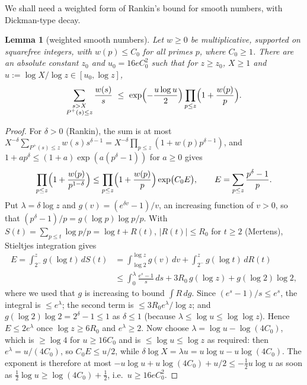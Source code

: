 \documentclass[11pt,a4paper]{article}
\newtheorem{lemma}[theorem]{Lemma}
\theoremstyle{remark}\newtheorem{remark}[theorem]{Remark}
\begin{document}
We shall need a weighted form of Rankin's bound for smooth numbers, with Dickman-type decay.

\begin{lemma}[weighted smooth numbers]\label{lem:rankin}
Let $w\ge0$ be multiplicative, supported on squarefree integers, with $w(p)\le C_0$ for all primes $p$, where
$C_0\ge1$. There are an absolute constant $z_0$ and $u_0=16eC_0^2$ such that for $z\ge z_0$, $X\ge1$ and
$u:=\log X/\log z\in[u_0,\log z]$,
\[
\sum_{\substack{s>X\\ P^+(s)\le z}}\frac{w(s)}{s}\ \le\ \exp\Bigl(-\frac{u\log u}2\Bigr)\prod_{p\le z}\Bigl(1+\frac{w(p)}p\Bigr).
\]
\end{lemma}
\begin{proof}
For $\delta>0$ (Rankin), the sum is at most
$X^{-\delta}\sum_{P^+(s)\le z}w(s)s^{\delta-1}=X^{-\delta}\prod_{p\le z}(1+w(p)p^{\delta-1})$, and
$1+ap^\delta\le(1+a)\exp(a(p^\delta-1))$ for $a\ge0$ gives
\[
\prod_{p\le z}\Bigl(1+\frac{w(p)}{p^{1-\delta}}\Bigr)\le\prod_{p\le z}\Bigl(1+\frac{w(p)}p\Bigr)\exp\bigl(C_0E\bigr),\qquad
E=\sum_{p\le z}\frac{p^\delta-1}{p}.
\]
Put $\lambda=\delta\log z$ and $g(v)=(e^{\delta v}-1)/v$, an increasing function of $v>0$, so that $(p^\delta-1)/p=g(\log p)\log p/p$.
With $S(t)=\sum_{p\le t}\log p/p=\log t+R(t)$, $|R(t)|\le R_0$ for $t\ge2$ (Mertens), Stieltjes integration gives
\[
\begin{aligned}
E=\int_{2^-}^{z}g(\log t)\,dS(t)&=\int_{\log2}^{\log z}g(v)\,dv+\int_{2^-}^{z}g(\log t)\,dR(t)\\
&\le\int_0^{\lambda}\frac{e^{s}-1}{s}\,ds+3R_0\,g(\log z)+g(\log2)\log2,
\end{aligned}
\]
where we used that $g$ is increasing to bound $\int R\,dg$. Since $(e^s-1)/s\le e^s$, the integral is $\le e^\lambda$; the
second term is $\le3R_0e^\lambda/\log z$; and $g(\log2)\log2=2^\delta-1\le1$ as $\delta\le1$ (because $\lambda\le\log u\le\log\log z$).
Hence $E\le2e^\lambda$ once $\log z\ge6R_0$ and $e^\lambda\ge2$. Now choose $\lambda=\log u-\log(4C_0)$, which is $\ge\log4$ for
$u\ge16C_0$ and is $\le\log u\le\log z$ as required: then $e^\lambda=u/(4C_0)$, so $C_0E\le u/2$, while
$\delta\log X=\lambda u=u\log u-u\log(4C_0)$. The exponent is therefore at most
$-u\log u+u\log(4C_0)+u/2\le-\tfrac12u\log u$ as soon as $\tfrac12\log u\ge\log(4C_0)+\tfrac12$, i.e.\ $u\ge16eC_0^2$.
\end{proof}
\end{document}
